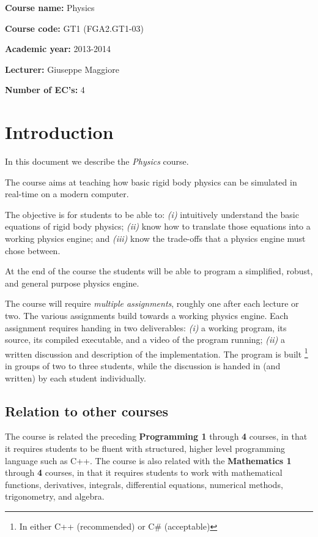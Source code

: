 \documentclass{article}
\begin{document}
\textbf{Course name:} Physics

\textbf{Course code:} GT1 (FGA2.GT1-03)

\textbf{Academic year:} 2013-2014

\textbf{Lecturer:} Giuseppe Maggiore

\textbf{Number of EC's:} 4


\section{Introduction}
In this document we describe the \textit{Physics} course. 

The course aims at teaching how basic rigid body physics can be simulated in real-time on a modern computer.

The objective is for students to be able to: \textit{(i)} intuitively understand the basic equations of rigid body physics; \textit{(ii)} know how to translate those equations into a working physics engine; and \textit{(iii)} know the trade-offs that a physics engine must chose between.

At the end of the course the students will be able to program a simplified, robust, and general purpose physics engine.

The course will require \textit{multiple assignments}, roughly one after each lecture or two. The various assignments build towards a working physics engine. Each assignment requires handing in two deliverables: \textit{(i)} a working program, its source, its compiled executable, and a video of the program running; \textit{(ii)} a written discussion and description of the implementation. The program is built \footnote{In either C++ (recommended) or C\# (acceptable)} in groups of two to three students, while the discussion is handed in (and written) by each student individually.


\subsection{Relation to other courses}
The course is related the preceding \textbf{Programming 1} through \textbf{4} courses, in that it requires students to be fluent with structured, higher level programming language such as C++. The course is also related with the \textbf{Mathematics 1} through \textbf{4} courses, in that it requires students to work with mathematical functions, derivatives, integrals, differential equations, numerical methods, trigonometry, and algebra.
\end{document}
